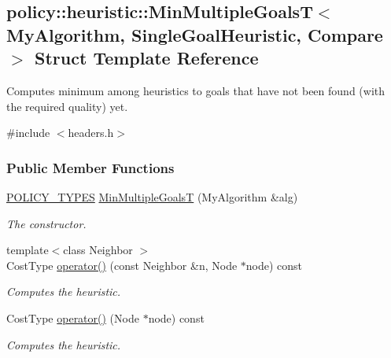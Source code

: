 \hypertarget{structpolicy_1_1heuristic_1_1MinMultipleGoalsT}{}\subsection{policy\+:\+:heuristic\+:\+:Min\+Multiple\+GoalsT$<$ My\+Algorithm, Single\+Goal\+Heuristic, Compare $>$ Struct Template Reference}
\label{structpolicy_1_1heuristic_1_1MinMultipleGoalsT}


Computes minimum among heuristics to goals that have not been found (with the required quality) yet.  




{\ttfamily \#include $<$headers.\+h$>$}

\subsubsection*{Public Member Functions}
\begin{DoxyCompactItemize}
\item 
\hyperlink{extensions_2shared__policies_2headers_8h_ae70a06fa4631780beea14971eb36a562}{P\+O\+L\+I\+C\+Y\+\_\+\+T\+Y\+P\+ES} \hyperlink{structpolicy_1_1heuristic_1_1MinMultipleGoalsT_abeab989f28d5adbc77c8943834d94091}{Min\+Multiple\+GoalsT} (My\+Algorithm \&alg)
\begin{DoxyCompactList}\small\item\em The constructor. \end{DoxyCompactList}\item 
{\footnotesize template$<$class Neighbor $>$ }\\Cost\+Type \hyperlink{structpolicy_1_1heuristic_1_1MinMultipleGoalsT_acaa7f629d5b8db59face180fac8ee17e}{operator()} (const Neighbor \&n, Node $\ast$node) const 
\begin{DoxyCompactList}\small\item\em Computes the heuristic. \end{DoxyCompactList}\item 
Cost\+Type \hyperlink{structpolicy_1_1heuristic_1_1MinMultipleGoalsT_ad390f6ba613718aa7d01045562610c30}{operator()} (Node $\ast$node) const 
\begin{DoxyCompactList}\small\item\em Computes the heuristic. \end{DoxyCompactList}\end{DoxyCompactItemize}
